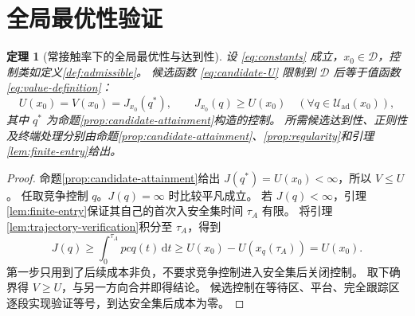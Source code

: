 \documentclass[11pt,a4paper,UTF8]{ctexart}
\newtheorem{theorem}{定理}[section]
\theoremstyle{definition}
\newcommand{\Dcal}{\mathcal D}
\newcommand{\Uad}{\mathcal U_{\mathrm{ad}}}
\newcommand{\dd}{\,\mathrm d}
\begin{document}
\section{全局最优性验证}
\label{sec:global-verification}
\begin{theorem}[常接触率下的全局最优性与达到性]
\label{thm:verification}
设 \eqref{eq:constants} 成立，$x_0\in\Dcal$，控制类如定义\ref{def:admissible}。
候选函数 \eqref{eq:candidate-U} 限制到 $\Dcal$ 后等于值函数 \eqref{eq:value-definition}：
\begin{equation}
U(x_0)=V(x_0)=J_{x_0}(q^*),\qquad
J_{x_0}(q)\ge U(x_0)\quad(\forall q\in\Uad(x_0)),
\label{eq:global-optimality}
\end{equation}
其中 $q^*$ 为命题\ref{prop:candidate-attainment}构造的控制。
所需候选达到性、正则性及终端处理分别由命题\ref{prop:candidate-attainment}、\ref{prop:regularity}和引理\ref{lem:finite-entry}给出。
\end{theorem}
\begin{proof}
命题\ref{prop:candidate-attainment}给出 $J(q^*)=U(x_0)<\infty$，所以 $V\le U$。
任取竞争控制 $q$。$J(q)=\infty$ 时比较平凡成立。
若 $J(q)<\infty$，引理\ref{lem:finite-entry}保证其自己的首次入安全集时间 $\tau_A$ 有限。
将引理\ref{lem:trajectory-verification}积分至 $\tau_A$，得到
\[
J(q)\ge\int_0^{\tau_A}pcq(t)\dd t
\ge U(x_0)-U(x_q(\tau_A))=U(x_0).
\]
第一步只用到了后续成本非负，不要求竞争控制进入安全集后关闭控制。
取下确界得 $V\ge U$，与另一方向合并即得结论。
候选控制在等待区、平台、完全跟踪区逐段实现验证等号，到达安全集后成本为零。
\end{proof}
\end{document}
